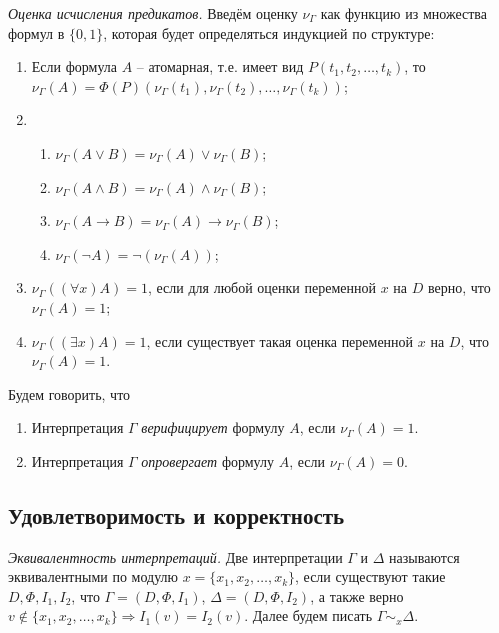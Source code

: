 \begin{definition}
  \emph{Оценка исчисления предикатов.} Введём оценку $\nu_{\Gamma}$ как функцию из множества формул в $\{0, 1\}$, которая будет определяться индукцией по структуре:
  \begin{enumerate}
  	\item Если формула $A$ -- атомарная, т.е. имеет вид $P(t_1, t_2, \ldots, t_k)$, то $\nu_{\Gamma}(A) = \Phi(P)(\nu_{\Gamma}(t_1), \nu_{\Gamma}(t_2), \ldots, \nu_{\Gamma}(t_k))$;
  	\item \begin{enumerate}
    		\item $\nu_\Gamma(A \vee B) = \nu_\Gamma(A) \vee \nu_\Gamma(B)$;
    		\item $\nu_\Gamma(A \wedge B) = \nu_\Gamma(A) \wedge \nu_\Gamma(B)$;
    		\item $\nu_\Gamma(A \rightarrow B) = \nu_\Gamma(A) \rightarrow \nu_\Gamma(B)$;
    		\item $\nu_\Gamma(\neg A) = \neg(\nu_\Gamma(A))$;
    	  \end{enumerate}
    \item $\nu_\Gamma((\forall x)A) = 1$, если для любой оценки переменной $x$ на $D$ верно, что $\nu_\Gamma(A) = 1$;
    
    \item $\nu_\Gamma((\exists x)A) = 1$, если существует такая оценка переменной $x$ на $D$, что $\nu_\Gamma(A) = 1$.
  \end{enumerate}
\end{definition}

Будем говорить, что 
\begin{enumerate}
	\item Интерпретация $\Gamma$ \textit{верифицирует} формулу $A$, если $\nu_{\Gamma}(A) = 1$.
	\item Интерпретация $\Gamma$ \textit{опровергает} формулу $A$, если $\nu_{\Gamma}(A) = 0$.
\end{enumerate}

\subsection{Удовлетворимость и корректность}

\begin{definition}
  \emph{Эквивалентность интерпретаций.} Две интерпретации $\Gamma$ и $\Delta$ называются эквивалентными по модулю $x = \{x_1, x_2, \ldots, x_k\}$, если существуют такие $D, \Phi, I_1, I_2$, что $\Gamma = {(D, \Phi, I_1)}$, $\Delta = {(D, \Phi, I_2)}$, а также верно $v \notin \{x_1, x_2, \ldots, x_k\} \Rightarrow I_1(v) = I_2(v)$. Далее будем писать $\Gamma \sim_x \Delta$.
\end{definition}

